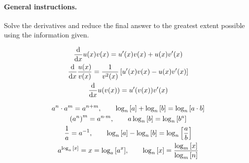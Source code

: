\documentclass[11pt,addpoints]{exam}
\begin{document}


\vspace{-1cm}

\paragraph{General instructions.}
Solve the derivatives and reduce the final answer to the greatest extent possible using the information given.



\begin{minipage}[c]{0.45\textwidth}
\begin{gather*}
    \dv{x}u(x)v(x) = u'(x)v(x) + u(x)v'(x) \\
    \dv{x}\frac{u(x)}{v(x)} = \frac{1}{v^{2}(x)}\left[ u'(x)v(x) - u(x)v'(x) \right] \\
    \dv{x}u(v(x)) = u'(v(x))v'(x)
\end{gather*}
\end{minipage}
\hfill
\begin{minipage}[c]{0.45\textwidth}
\begin{gather*}
    a^{n}\cdot a^{m} = a^{n+m},\qquad  \log_{n}\qty[a] + \log_{n}\qty[b] = \log_{n}\qty[a\cdot b] \\
    \qty(a^{n})^{m} = a^{n\cdot m},\qquad  a\log_{n}\qty[b] = \log_{n}\qty[b^a] \\
    \frac{1}{a} = a^{-1},\qquad  \log_{n}\qty[a] - \log_{n}\qty[b] = \log_{n}\qty[\frac{a}{b}] \\
    a^{\log_{a}\qty[x]} = x = \log_a\qty[a^{x}],\qquad  \log_{n}\qty[x] = \frac{\log_{m}\qty[x]}{\log_{m}\qty[n]}
\end{gather*}
\end{minipage}



%
%
\end{document}
